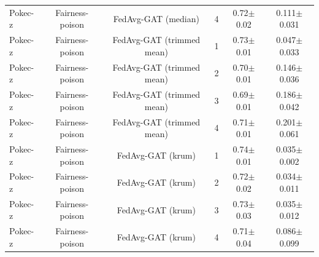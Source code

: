 \begin{table}[tbp]
\begin{tabular}{lccccc}
Pokec-z & Fairness-poison & FedAvg-GAT (median) & 4 & 0.72$\pm$0.02 & 0.111$\pm$0.031 \\
Pokec-z & Fairness-poison & FedAvg-GAT (trimmed mean) & 1 & 0.73$\pm$0.01 & 0.047$\pm$0.033 \\
Pokec-z & Fairness-poison & FedAvg-GAT (trimmed mean) & 2 & 0.70$\pm$0.01 & 0.146$\pm$0.036 \\
Pokec-z & Fairness-poison & FedAvg-GAT (trimmed mean) & 3 & 0.69$\pm$0.01 & 0.186$\pm$0.042 \\
Pokec-z & Fairness-poison & FedAvg-GAT (trimmed mean) & 4 & 0.71$\pm$0.01 & 0.201$\pm$0.061 \\
Pokec-z & Fairness-poison & FedAvg-GAT (krum) & 1 & 0.74$\pm$0.01 & 0.035$\pm$0.002 \\
Pokec-z & Fairness-poison & FedAvg-GAT (krum) & 2 & 0.72$\pm$0.02 & 0.034$\pm$0.011 \\
Pokec-z & Fairness-poison & FedAvg-GAT (krum) & 3 & 0.73$\pm$0.03 & 0.035$\pm$0.012 \\
Pokec-z & Fairness-poison & FedAvg-GAT (krum) & 4 & 0.71$\pm$0.04 & 0.086$\pm$0.099 \\
\bottomrule
\end{tabular}
\end{table}
